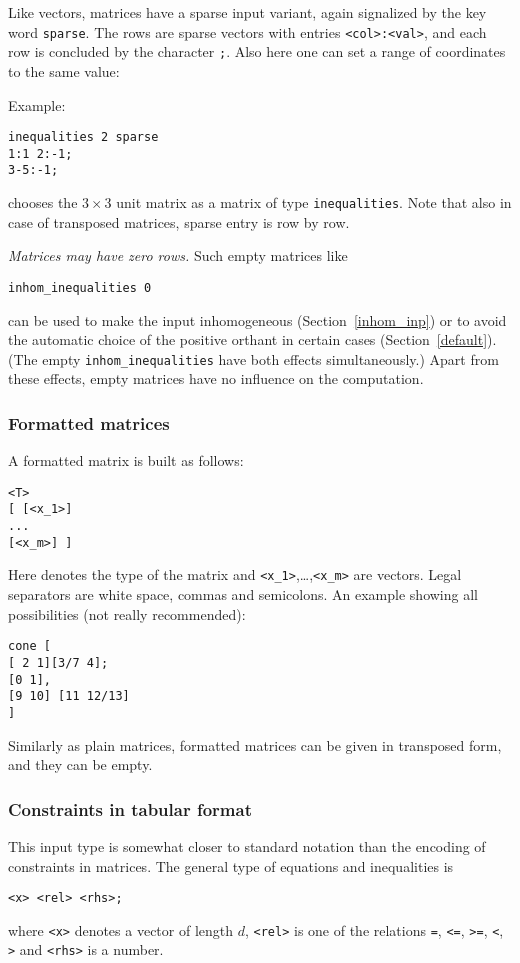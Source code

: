 Like vectors, matrices have a sparse input variant, again signalized by the key word \verb|sparse|. The rows are sparse vectors with entries \verb|<col>:<val>|, and each row is concluded by the character \verb|;|. Also here one can set a range of coordinates to the same value:

Example:
\begin{Verbatim}
inequalities 2 sparse
1:1 2:-1;
3-5:-1;
\end{Verbatim}
chooses the $3\times 3$ unit matrix as a matrix of type \verb|inequalities|. Note that also in case of transposed matrices, sparse entry is row by row.

\emph{Matrices may have zero rows.} Such empty matrices like
\begin{Verbatim}
inhom_inequalities 0
\end{Verbatim}
can be used to make the input inhomogeneous (Section~\ref{inhom_inp}) or to avoid the automatic choice of the positive orthant in certain cases (Section~\ref{default}). (The empty \verb|inhom_inequalities| have both effects simultaneously.) Apart from these effects, empty matrices have no influence on the computation.

\subsubsection{Formatted matrices}

A formatted matrix is built as follows:
\begin{Verbatim}
<T>
[ [<x_1>]
...
[<x_m>] ]
\end{Verbatim}
Here  denotes the type of the matrix and \verb|<x_1>|,\dots,\verb|<x_m>| are vectors. Legal separators are white space, commas and semicolons. An example showing all possibilities (not really recommended):
\begin{Verbatim}
cone [
[ 2 1][3/7 4];
[0 1],
[9 10] [11 12/13]
]
\end{Verbatim}
Similarly as plain matrices, formatted matrices can be given in transposed form, and they can be empty.

\subsubsection{Constraints in tabular format}\label{const_syntax}

This input type is somewhat closer to standard notation than the encoding of constraints in matrices. The general type of equations and inequalities is
\begin{Verbatim}
<x> <rel> <rhs>;
\end{Verbatim}
where \verb|<x>| denotes a vector of length $d$, \verb|<rel>| is one of the relations \verb|=|, \verb|<=|, \verb|>=|, \verb|<|, \verb|>| and \verb|<rhs>| is a number.


